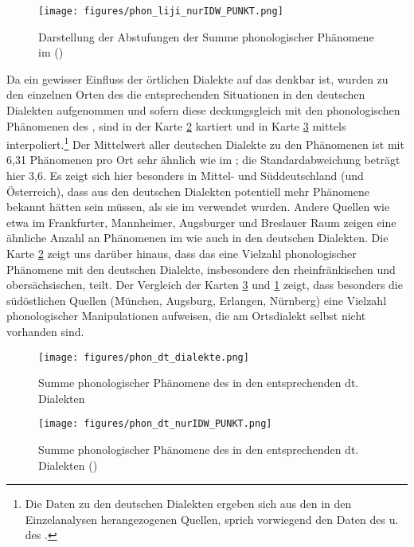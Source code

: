 		
\begin{figure}[h!]
		\centering
\texttt{[image: figures/phon\_liji\_nurIDW\_PUNKT.png]}
		\caption{\label{kartelijiIDW} Darstellung der Abstufungen der Summe phonologischer Phänomene im  ()}
		\end{figure}
\FloatBarrier


Da ein gewisser Einfluss der örtlichen Dialekte auf das  denkbar ist, wurden zu den einzelnen Orten des  die entsprechenden Situationen in den deutschen Dialekten aufgenommen und sofern diese deckungsgleich mit den phonologischen Phänomenen des , sind in der Karte \ref{allphondt} kartiert und in Karte \ref{IDWphondt} mittels  interpoliert.\footnote{Die Daten zu den deutschen Dialekten ergeben sich aus den in den Einzelanalysen herangezogenen Quellen, sprich vorwiegend den Daten des  u. des .} Der Mittelwert aller deutschen Dialekte zu den Phänomenen ist mit  6,31 Phänomenen pro Ort sehr ähnlich wie im ; die Standardabweichung beträgt hier 3,6. Es zeigt sich hier besonders in Mittel- und Süddeutschland (und Österreich), dass aus den deutschen Dialekten potentiell mehr Phänomene bekannt hätten sein müssen, als sie im  verwendet wurden. Andere Quellen wie etwa im Frankfurter, Mannheimer, Augsburger und Breslauer Raum zeigen eine ähnliche Anzahl an Phänomenen im  wie auch in den deutschen Dialekten. Die Karte \ref{allphondt} zeigt uns darüber hinaus, dass das  eine Vielzahl phonologischer Phänomene mit den deutschen Dialekte, insbesondere den rheinfränkischen und obersächsischen, teilt. Der Vergleich der Karten \ref{IDWphondt} und \ref{kartelijiIDW} zeigt, dass besonders die südöstlichen Quellen (München, Augsburg, Erlangen, Nürnberg) eine Vielzahl phonologischer Manipulationen aufweisen, die am Ortsdialekt selbst nicht vorhanden sind. \\




 \begin{figure}[h!]
		\centering
\texttt{[image: figures/phon\_dt\_dialekte.png]}
		\caption{\label{allphondt} Summe phonologischer Phänomene des  in den entsprechenden dt. Dialekten}
		\end{figure}
		
		
\begin{figure}[h!]
		\centering
\texttt{[image: figures/phon\_dt\_nurIDW\_PUNKT.png]}
		\caption{\label{IDWphondt} Summe phonologischer Phänomene des  in den entsprechenden dt. Dialekten ()}
		\end{figure}
\FloatBarrier
		
